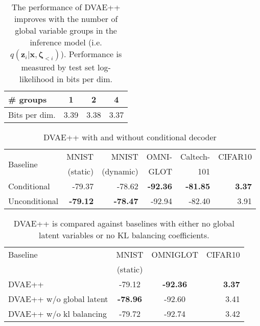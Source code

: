 \documentclass{article}
\newcommand{\x}{{\pmb{x}}}
\newcommand{\z}{{\pmb{z}}}
\newcommand{\bzeta}{{\pmb{\zeta}}}
\begin{document}
\begin{table}
\centering
  \caption{The performance of DVAE++ improves with the number of global variable groups in the inference model 
  (i.e. $q(\z_i | \x, \bzeta_{<i})$). Performance is measured by test set log-likelihood in bits per dim.}
\begin{tabular}{ l|c|c|c}    \# groups           & 1     & 2      & 4    \\
\hline
Bits per dim.       & 3.39 & 3.38  & 3.37 \\
\end{tabular} \label{tab:num_layer_global}
\end{table}

\setlength{\tabcolsep}{2pt}
\begin{table}
\caption{DVAE++ with and without conditional decoder} \label{tab:ab_cond}
\small
\centering
\begin{tabular}{l r r r r r}
\multirow{2}{*}{Baseline}  & MNIST & MNIST & OMNI- & Caltech- & CIFAR10 \\
  & (static) & (dynamic) & GLOT  & 101 &  \\
\hline
Conditional   & -79.37 & -78.62 & \textbf{-92.36} & \textbf{-81.85} & \textbf{3.37} \\
\hline
Unconditional & \textbf{-79.12} & \textbf{-78.47} & -92.94 & -82.40 & 3.91 \\
\hline
\end{tabular}
\end{table}

\begin{table}
\caption{DVAE++ is compared against baselines with either 
no global latent variables or no KL balancing coefficients.} \label{tab:ab_gl_kl}
\small
\centering
\begin{tabular}{l c c r}
Baseline  & MNIST & OMNIGLOT & CIFAR10 \\
  & (static) & & \\
\hline
DVAE++                   & -79.12 & \textbf{-92.36} & \textbf{3.37}\\
\hline
DVAE++ w/o global latent & \textbf{-78.96} & -92.60 & 3.41 \\
\hline
DVAE++ w/o kl balancing  & -79.72 & -92.74 &  3.42 \\
\hline
\end{tabular}
\end{table}
\end{document}
